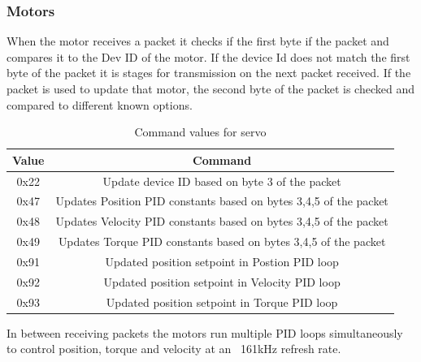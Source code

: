     \subsubsection{Motors}
        When the motor receives a packet it checks if the first byte if the packet and compares it to the Dev ID of the motor. If the device Id does not match the first byte of the packet it is stages for transmission on the next packet received. If the packet is used to update that motor, the second byte of the packet is checked and compared to different known options. 
        \begin{table}[H]
            \centering
            \begin{tabular}{|c|c|}
            \hline
                Value & Command \\
                \hline
                0x22 & Update device ID based on byte 3 of the packet\\
                0x47 & Updates Position PID constants based on bytes 3,4,5 of the packet \\
                0x48 & Updates Velocity PID constants based on bytes 3,4,5 of the packet \\
                0x49 & Updates Torque PID constants based on bytes 3,4,5 of the packet \\
                0x91 & Updated position setpoint in Postion PID loop\\
                0x92 & Updated position setpoint in Velocity PID loop\\
                0x93 & Updated position setpoint in Torque PID loop\\
                \hline
                \end{tabular}
            \caption{Command values for servo}
            \label{tab:ServoCommandValues}
        \end{table}
    In between receiving packets the motors run multiple PID loops simultaneously to control position, torque and velocity at an ~161kHz refresh rate.
